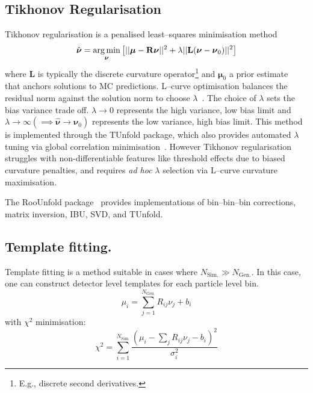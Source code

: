 \subsection{Tikhonov Regularisation}  
Tikhonov regularisation is a penalised least--squares minimisation method
\begin{equation}
    \hat{\boldsymbol{\nu}} =\underset{\boldsymbol{\nu}}{\arg\min} \left[ ||\vb*{\mu} - \mathbf{R}\boldsymbol{\nu}||^2 + \lambda ||\mathbf{L}(\boldsymbol{\nu} - \boldsymbol{\nu}_0)||^2 \right]
\end{equation}  
where \(\mathbf{L}\) is typically the discrete curvature operator\footnote{E.g., discrete second derivatives.} and \(\boldsymbol{\mu}_0\) a prior estimate~\cite{cowan_topics_2009} that anchors solutions to MC predictions.
%
L--curve optimisation balances the residual norm against the solution norm to choose \(\lambda\)~\cite{cowan_highlights_2011}.
%
The choice of \(\lambda\) sets the bias variance trade off.
%
\(\lambda \rightarrow 0\) represents the high variance, low bias limit and \(\lambda \rightarrow \infty (\implies \hat{\boldsymbol{\nu}} \rightarrow \boldsymbol{\nu}_0)\) represents the low variance, high bias limit.
%
This method is implemented through the TUnfold package, which also provides automated \(\lambda\) tuning via global correlation minimisation~\cite{schmitt_tunfold_2012}.
%
However Tikhonov regularisation struggles with non-differentiable features like threshold effects due to biased curvature penalties, and requires \textit{ad hoc} \(\lambda\) selection via L--curve curvature maximisation.

\begin{note}
    The RooUnfold package~\cite{adye_unfolding_2011} provides implementations of bin--bin--bin corrections, matrix inversion, IBU, SVD, and TUnfold.
\end{note}
\subsection{Template fitting.}  
Template fitting is a method suitable in cases where \(N_{\text{Sim.}} \gg N_{\text{Gen.}}\).
%
In this case, one can construct detector level templates for each particle level bin. 
\begin{equation}
    \mu_i = \sum_{j=1}^{N_{\text{Gen.}}} R_{ij} \nu_j + b_i
\end{equation}  
with \(\chi^2\) minimisation:  
\begin{equation}
    \chi^2 = \sum_{i=1}^{N_{\text{Sim.}}} \frac{(\mu_i - \sum_j R_{ij}\nu_j - b_i)^2}{\sigma_i^2}
\end{equation}  

